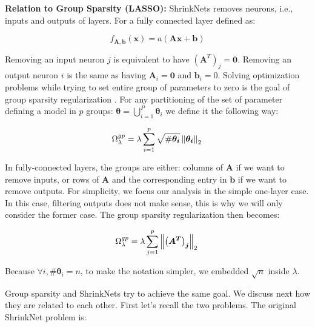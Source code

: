\noindent\textbf{Relation to Group Sparsity (LASSO): } ShrinkNets removes neurons,
i.e., inputs and outputs of layers. For a fully connected layer defined as:

\begin{equation} \label{fully_connected}
  f_{\bm{A}, \bm{b}}(\bm{x})=a(\bm{Ax + b})
\end{equation}

Removing an input neuron $j$ is equivalent to have $\left(\bm{A}^T\right)_j =
\bm{0}$. Removing an output neuron $i$ is the same as having $\bm{A}_i = \bm{0}$
and $\bm{b}_i = 0$. Solving optimization problems while trying to set entire
group of parameters to zero is the goal of group sparsity regularization
\cite{}. For any partitioning of the set of parameter defining a model in $p$
groups: $\bm{\theta} = \bigcup_{i=1}^P \bm{\theta}_i$ we define it the following
way:

\begin{equation}
  \Omega_\lambda^{gp} = \lambda \sum_{i=1}^p \sqrt{\#\bm{\theta_i}} \left\lVert\bm{\theta_i}\right\rVert_2 \\
\end{equation}

In fully-connected layers, the groups are either: columns of
$\bm{A}$ if we want to remove inputs, or rows of $\bm{A}$ and the corresponding
entry in $\bm{b}$ if we want to remove outputs. For simplicity, we focus
our analysis in the simple one-layer case. In this case, filtering outputs does
not make sense, this is why we will only consider the former case. The
group sparsity regularization then becomes:

\begin{equation} \label{group_sparsity_regularization}
  \Omega_\lambda^{gp} = \lambda \sum_{j=1}^p \left\lVert\bm{\left(A^T\right)_j}\right\rVert_2 \\
\end{equation}

Because $\forall i, \#\bm{\theta}_i = n$, to make the notation simpler, we
embedded $\sqrt{n}$ inside $\lambda$.

Group sparsity and ShrinkNets try to achieve the same goal. We discuss next how
they are related to each other. First let's recall the two problems. The
original ShrinkNet problem is:

